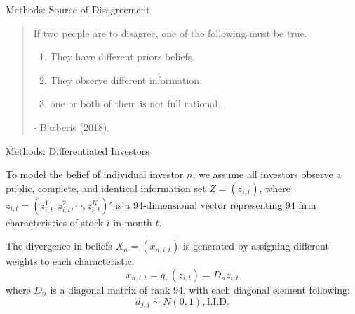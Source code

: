 \documentclass[11pt, aspectratio=169]{beamer}
\newenvironment{wideitemize}{\itemize\addtolength{\itemsep}{10pt}}{\enditemize}
\begin{document}
\begin{frame}{Methods: Source of Disagreement }
    \begin{quote}
    If two people are to disagree, one of the following must be true.
    \bigskip
    \begin{enumerate}
        \item \alert{They have different priors beliefs.}
    \bigskip
        \item They observe different information.
    \bigskip
        \item one or both of them is not full rational.
    \end{enumerate}
    \bigskip
    - Barberis (2018).
    \end{quote}
\end{frame}


\begin{frame}{Methods: Differentiated Investors}
    \bigskip
    \begin{wideitemize}
    \item To model the belief of individual investor $n$, we assume all investors observe a \alert{public, complete, and identical} information set $Z = (z_{i, t})$, where $z_{i,t}=(z_{i,t}^{1},z_{i,t}^{2},\cdots,z_{i,t}^{K})'$ is a 94-dimensional vector representing 94 firm characteristics of stock $i$ in month $t$. 
    \item The divergence in beliefs $X_{n} = (x_{n,i,t})$ is generated by assigning different weights to each characteristic:
    \begin{equation*}
        x_{n,i,t} = g_n(z_{i,t}) = D_{n}z_{i,t}
    \end{equation*}
    where $D_{n}$ is a diagonal matrix of rank 94, with each diagonal element following:
    \begin{equation*}
        d_{j,j} \sim N(0,1), \text{I.I.D.}
    \end{equation*}
    \end{wideitemize}
\end{frame}
\end{document}
